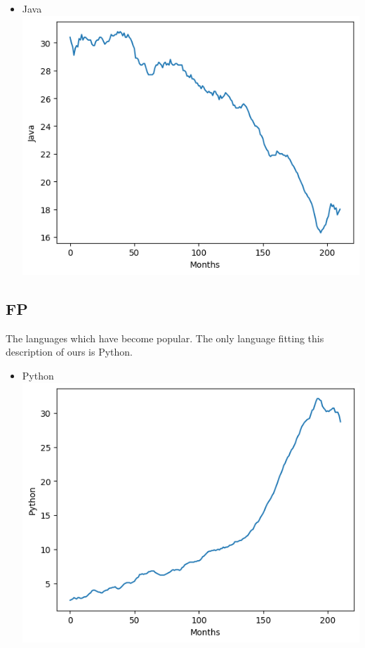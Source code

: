 \documentclass[conference]{IEEEtran}
\begin{document}
\begin{itemize}
\item{Java}
\includegraphics[scale=0.4]{lineplot/java.png}
\end{itemize}

\subsection{FP}
The languages which have become popular. The only language fitting this description of ours is Python.
\begin{itemize}
\item{Python}
\includegraphics[scale=0.4]{lineplot/python.png}
\end{itemize}
\end{document}
